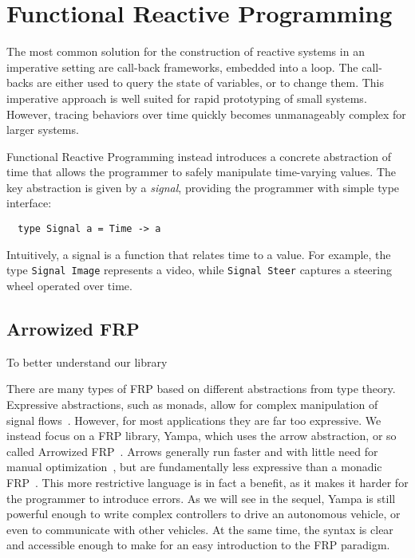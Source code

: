 \section{Functional Reactive Programming}

The most common solution for the construction of reactive systems in an imperative setting are call-back frameworks, embedded into a loop.
The call-backs are either used to query the state of variables, or to change them.
This imperative approach is well suited for rapid prototyping of small systems.
However, tracing behaviors over time quickly becomes unmanageably complex for larger systems.

Functional Reactive Programming instead introduces a concrete abstraction of time that allows the programmer to safely manipulate time-varying values. 
The key abstraction is given by a \textit{signal}, providing the programmer with simple type interface:

\begin{lstlisting}
  type Signal a = Time -> a
\end{lstlisting}

\noindent Intuitively, a signal is a function that relates time to a value.
For example, the type \texttt{Signal Image} represents a video, while \texttt{Signal Steer} captures a steering wheel operated over time.

\subsection{Arrowized FRP}

To better understand our library 

There are many types of FRP based on different abstractions from type theory.
Expressive abstractions, such as monads, allow for complex manipulation of signal flows~\cite{van2014monadic}. 
However, for most applications they are far too expressive.
We instead focus on a FRP library, Yampa, which uses the arrow abstraction, or so called Arrowized FRP~\cite{hudak2003arrows}.
Arrows generally run faster and with little need for manual optimization~\cite{yallop2016causal}, but are fundamentally less expressive than a monadic FRP~\cite{lindley2011idioms}.
This more restrictive language is in fact a benefit, as it makes it harder for the programmer to introduce errors.
As we will see in the sequel, Yampa is still powerful enough to write complex controllers to drive an autonomous vehicle, or even to communicate with other vehicles.
At the same time, the syntax is clear and accessible enough to make for an easy introduction to the FRP paradigm.

